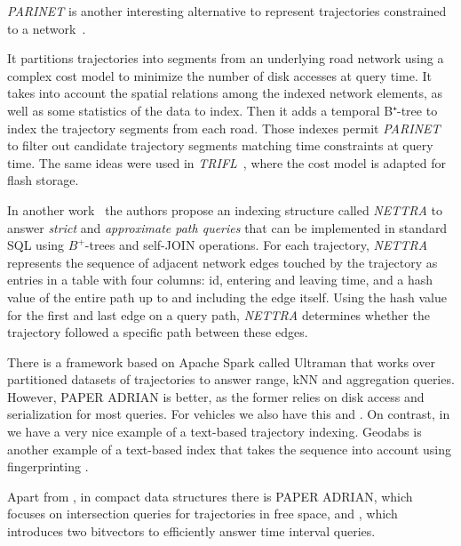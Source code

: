 \documentclass[runningheads]{llncs}
\begin{document}
{\em PARINET} is another interesting alternative to represent trajectories constrained to a network~\cite{DBLP:journals/vldb/PopaZOBV11}. %

It partitions trajectories into segments from an underlying road network using a
complex cost model to minimize the number of disk accesses at query time. It takes into
account the spatial relations among the indexed network elements, as well as some statistics
of the data to index. Then it adds a temporal B$⁺$-tree to index the trajectory segments from each road.
Those indexes permit {\em PARINET} to filter out candidate trajectory segments matching time constraints at query time.
The same ideas were used in {\em TRIFL}~\cite{that2015trifl}, where the cost model is adapted
for flash storage.

In another work~\cite{DBLP:conf/gis/KroghPTT14} the authors propose an indexing structure called {\em NETTRA} to answer  
{\em strict}  and {\em approximate path queries} that can be implemented in standard SQL using $B^+$-trees and self-JOIN operations.  
For each trajectory, {\em NETTRA} represents the sequence of adjacent network edges touched by the trajectory as  
entries in a table  with four columns:  id, entering and leaving time, and a hash value 
 of the entire path up to and including the edge itself.
Using the hash value  for the first and last
edge on a query path, {\em NETTRA}  determines whether
the trajectory followed a specific path between these edges.

There is a framework based on Apache Spark called Ultraman \cite{ding2018ultraman} that works over partitioned datasets of trajectories to answer range, kNN and aggregation queries. However, PAPER ADRIAN is better, as the former relies on disk access and serialization for most queries. For vehicles we also have this \cite{cai2018vector} and \cite{lovell2018lossless}. On contrast, in \cite{al2017semantictraj} we have a very nice example of a text-based trajectory indexing. Geodabs is another example of a text-based index that takes the sequence into account using fingerprinting \cite{chapuis2018geodabs}.

Apart from \cite{koide2018cinct}, in compact data structures there is PAPER ADRIAN, which focuses on intersection queries for trajectories in free space, and  \cite{rivera2018faster}, which introduces two bitvectors to efficiently answer time interval queries.
\end{document}
